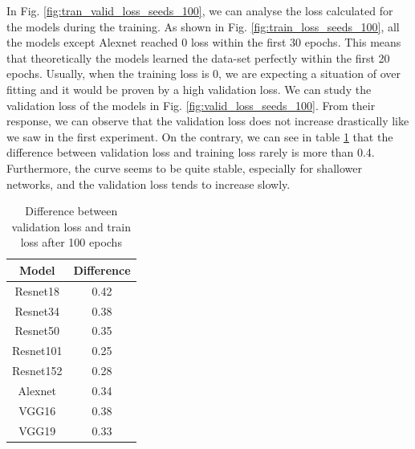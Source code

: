 In Fig. \ref{fig:tran_valid_loss_seeds_100}, we can analyse the loss calculated for the models during the training. As shown in Fig. \ref{fig:train_loss_seeds_100}, all the models except Alexnet reached 0 loss within the first 30 epochs. This means that theoretically the models learned the data-set perfectly within the first 20 epochs. Usually, when the training loss is 0, we are expecting a situation of over fitting and it would be proven by a high validation loss. We can study the validation loss of the models in Fig. \ref{fig:valid_loss_seeds_100}. From their response, we can observe that the validation loss does not increase drastically like we saw in the first experiment. On the contrary, we can see in table \ref{tab:difference_val_tra_loss} that the difference between validation loss and training loss rarely is more than 0.4. Furthermore, the curve seems to be quite stable, especially for shallower networks, and the validation loss tends to increase slowly. 

\begin{table}[h]
\centering
        \begin{tabular}{ c c  }
                 Model&Difference\\
                 \hline
                   Resnet18&0.42\\
                    Resnet34&0.38\\
                    Resnet50&0.35\\
                    Resnet101&0.25\\
                    Resnet152&0.28\\
                    Alexnet&0.34\\
                        VGG16&0.38\\
                    VGG19&0.33\\
                    \end{tabular}
                    \caption{Difference between validation loss and train loss after 100 epochs }                   
                     \label{tab:difference_val_tra_loss}
     \end{table} 


